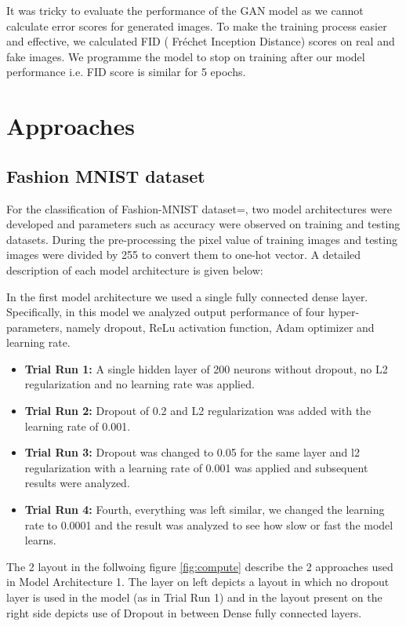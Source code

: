 \documentclass{article}
\begin{document}
It was tricky to evaluate the performance of the GAN model as we cannot calculate error scores for generated images. To make the training process easier and effective, we calculated FID ( Fréchet Inception Distance) scores on real and fake images. We programme the model to stop on training after our model performance i.e. FID score is similar for 5 epochs. 



 \iffalse

\section{Approaches}

\subsection{Fashion MNIST dataset}

For the classification of Fashion-MNIST dataset=, two model architectures were developed and parameters such as accuracy were observed on training  and testing datasets. During the pre-processing the pixel value of training images and testing images were divided by 255 to convert them to one-hot vector. A detailed description of each model architecture is given below:

In the first model architecture we used a single fully connected dense layer. Specifically, in this model we analyzed output performance of four hyper-parameters, namely dropout, ReLu activation function, Adam optimizer and learning rate.
\begin{itemize}
    \item \textbf{Trial Run 1:} A single hidden layer of 200 neurons without dropout, no L2 regularization and no learning rate was applied.
    \item \textbf{Trial Run 2:} Dropout of 0.2 and L2 regularization was added with the learning rate of 0.001.
    \item \textbf{Trial Run 3:} Dropout was changed to 0.05 for the same layer and l2 regularization with a learning rate of 0.001 was applied and subsequent results were analyzed.
    \item \textbf{Trial Run 4:} Fourth, everything was left similar, we changed the learning rate to 0.0001 and the result was analyzed to see how slow or fast the model learns.
\end{itemize}

The 2 layout in the follwoing figure \ref{fig:compute} describe the 2 approaches used in Model Architecture 1. The layer on left depicts a layout in which no dropout layer is used in the model (as in Trial Run 1) and in the layout present on the right side depicts use of Dropout in between Dense fully connected layers.
\end{document}
